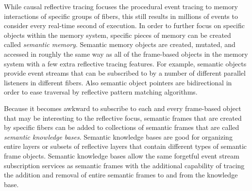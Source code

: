 While causal reflective tracing focuses the procedural event tracing
to memory interactions of specific groups of fibers, this still
results in millions of events to consider every real-time second of
execution.  In order to further focus on specific objects within the
memory system, specific pieces of memory can be created called
{\emph{semantic memory}}.  Semantic memory objects are created,
mutated, and accessed in roughly the same way as all of the
frame-based objects in the memory system with a few extra reflective
tracing features.  For example, semantic objects provide event streams
that can be subscribed to by a number of different parallel listeners
in different fibers.  Also semantic object pointers are bidirectional
in order to ease traversal by reflective pattern matching algorithms.

Because it becomes awkward to subscribe to each and every frame-based
object that may be interesting to the reflective focus, semantic
frames that are created by specific fibers can be added to collections
of semantic frames that are called {\emph{semantic knowledge bases}}.
Semantic knowledge bases are good for organizing entire layers or
subsets of reflective layers that contain different types of semantic
frame objects.  Semantic knowledge bases allow the same forgetful
event stream subscription services as semantic frames with the
additional capability of tracing the addition and removal of entire
semantic frames to and from the knowledge base.

